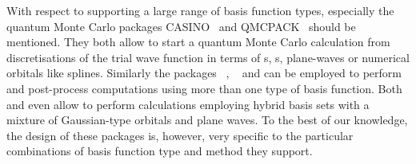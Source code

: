 With respect to supporting a large range of basis function types,
especially the quantum Monte Carlo packages CASINO~\cite{Needs2010}
and QMCPACK~\cite{Kim2012} should be mentioned.
They both allow to start a quantum Monte Carlo calculation
from discretisations of the trial wave function
in terms of {\cGTO}s, {\STO}s, plane-waves or numerical orbitals like splines.
Similarly the packages \CPtK~\cite{Hutter2014}, \ASE~\cite{Larsen2017}
and \gpaw can be employed to perform and post-process computations
using more than one type of basis function.
Both \gpaw and \CPtK even allow to perform calculations
employing hybrid basis sets with a mixture of
Gaussian-type orbitals and plane waves.
To the best of our knowledge,
the design of these packages is, however,
very specific to the particular combinations of basis function type
and method they support.
